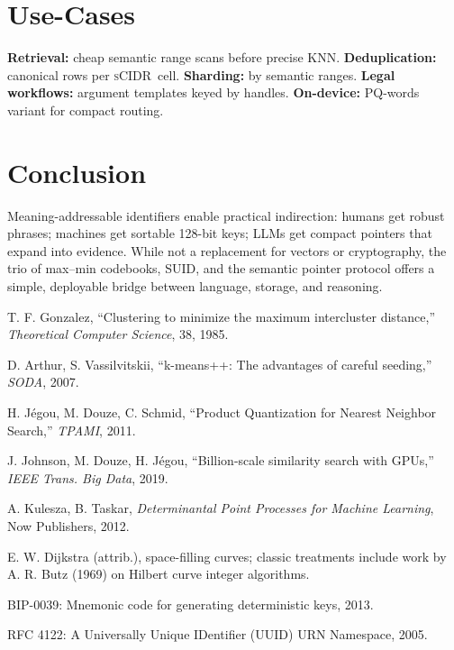 \documentclass[11pt]{article}
\newcommand{\suid}{\textsc{SUID}}
\newcommand{\scidr}{\textsc{sCIDR}}
\newcommand{\pq}{\textsc{PQ}}
\begin{document}
\section*{Use-Cases}
\textbf{Retrieval:} cheap semantic range scans before precise KNN. \textbf{Deduplication:} canonical rows per \scidr\ cell. \textbf{Sharding:} by semantic ranges. \textbf{Legal workflows:} argument templates keyed by handles. \textbf{On-device:} \pq-words variant for compact routing.

\section*{Conclusion}
Meaning-addressable identifiers enable practical indirection: humans get robust phrases; machines get sortable 128-bit keys; LLMs get compact pointers that expand into evidence. While not a replacement for vectors or cryptography, the trio of max--min codebooks, \suid, and the semantic pointer protocol offers a simple, deployable bridge between language, storage, and reasoning.

\begin{thebibliography}{9}
T. F. Gonzalez, ``Clustering to minimize the maximum intercluster distance,'' \emph{Theoretical Computer Science}, 38, 1985.

D. Arthur, S. Vassilvitskii, ``k-means++: The advantages of careful seeding,'' \emph{SODA}, 2007.

H. Jégou, M. Douze, C. Schmid, ``Product Quantization for Nearest Neighbor Search,'' \emph{TPAMI}, 2011.

J. Johnson, M. Douze, H. Jégou, ``Billion-scale similarity search with GPUs,'' \emph{IEEE Trans. Big Data}, 2019.

A. Kulesza, B. Taskar, \emph{Determinantal Point Processes for Machine Learning}, Now Publishers, 2012.

E. W. Dijkstra (attrib.), space-filling curves; classic treatments include work by A. R. Butz (1969) on Hilbert curve integer algorithms.

BIP-0039: Mnemonic code for generating deterministic keys, 2013.

RFC 4122: A Universally Unique IDentifier (UUID) URN Namespace, 2005.
\end{thebibliography}
\end{document}
